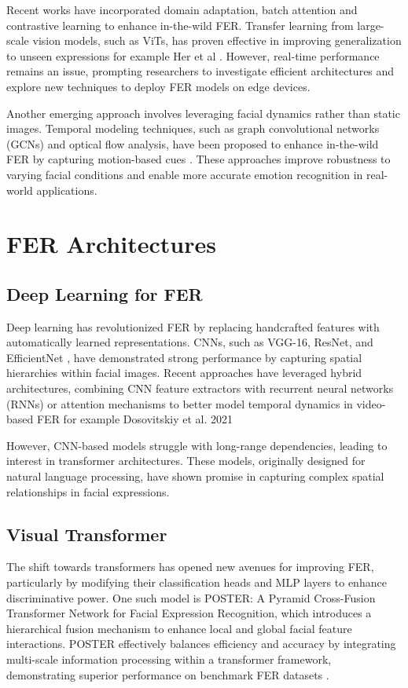  
Recent works have incorporated domain adaptation, batch attention and contrastive learning to enhance in-the-wild FER. Transfer learning from large-scale vision models, such as ViTs, has proven effective in improving generalization to unseen expressions for example Her et al \cite{her_batch_2024}. However, real-time performance remains an issue, prompting researchers to investigate efficient architectures and explore new techniques to deploy FER models on edge devices.


Another emerging approach involves leveraging facial dynamics rather than static images. Temporal modeling techniques, such as graph convolutional networks (GCNs) and optical flow analysis, have been proposed to enhance in-the-wild FER by capturing motion-based cues \cite{wang_survey_2024}. These approaches improve robustness to varying facial conditions and enable more accurate emotion recognition in real-world applications. 

\section{FER Architectures}


\subsection{Deep Learning for FER}

Deep learning has revolutionized FER by replacing handcrafted features with automatically learned representations. CNNs, such as VGG-16, ResNet, and EfficientNet \cite{tan_efficientnet_2020}, have demonstrated strong performance by capturing spatial hierarchies within facial images. Recent approaches have leveraged hybrid architectures, combining CNN feature extractors with recurrent neural networks (RNNs) or attention mechanisms to better model temporal dynamics in video-based FER for example Dosovitskiy et al. 2021 \cite{dosovitskiy_image_2021} 

However, CNN-based models struggle with long-range dependencies, leading to interest in transformer architectures. These models, originally designed for natural language processing, have shown promise in capturing complex spatial relationships in facial expressions. 

\subsection{Visual Transformer}

The shift towards transformers has opened new avenues for improving FER, particularly by modifying their classification heads and MLP layers to enhance discriminative power.  One such model is POSTER: A Pyramid Cross-Fusion Transformer Network for Facial Expression Recognition, which introduces a hierarchical fusion mechanism to enhance local and global facial feature interactions. POSTER effectively balances efficiency and accuracy by integrating multi-scale information processing within a transformer framework, demonstrating superior performance on benchmark FER datasets \cite{zheng_poster_2022}.


